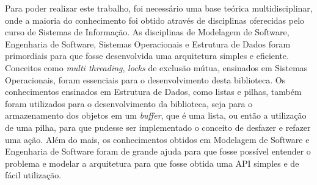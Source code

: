 \documentclass[12pt, %
openright,
oneside, %
a4paper,    %
brazil]{facom-ufu-abntex2}
\begin{document}
Para poder realizar este trabalho, foi necessário uma base teórica multidisciplinar, onde a maioria do conhecimento foi obtido através de disciplinas oferecidas pelo curso de Sistemas de Informação. As disciplinas de Modelagem de Software, Engenharia de Software, Sistemas Operacionais e Estrutura de Dados foram primordiais para que fosse desenvolvida uma arquitetura simples e eficiente. Conceitos como \textit{multi threading}, \textit{locks} de exclusão mútua, ensinados em Sistemas Operacionais, foram essenciais para o desenvolvimento desta biblioteca. Os conhecimentos ensinados em Estrutura de Dados, como listas e pilhas, também foram utilizados para o desenvolvimento da biblioteca, seja para o armazenamento dos objetos em um \textit{buffer}, que é uma lista, ou então a utilização de uma pilha, para que pudesse ser implementado o conceito de desfazer e refazer uma ação. Além do mais, os conhecimentos obtidos em Modelagem de Software e Engenharia de Software foram de grande ajuda para que fosse possível entender o problema e modelar a arquitetura para que fosse obtida uma API simples e de fácil utilização.

\postextual





\iffalse
\begin{apendicesenv}

\partapendices
\chapter{Quisque libero justo}

\lipsum[50]

\chapter{Coisas que fiz e que achei interessante mas não tanto para entrar no corpo do texto}
\lipsum[55-57]
\end{apendicesenv}
\fi
\end{document}
